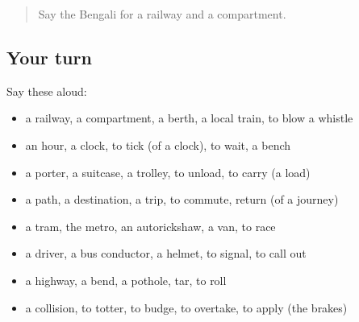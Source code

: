 \label{lesson:BN-R391-review-384-391}



\begin{quote}
Say the Bengali for a railway and a compartment.
\end{quote}

\subsection*{Your turn}
Say these aloud:

\begin{itemize}
\raggedright
  \item a railway, a compartment, a berth, a local train, to blow a whistle
  \item an hour, a clock, to tick (of a clock), to wait, a bench
  \item a porter, a suitcase, a trolley, to unload, to carry (a load)
  \item a path, a destination, a trip, to commute, return (of a journey)
  \item a tram, the metro, an autorickshaw, a van, to race
  \item a driver, a bus conductor, a helmet, to signal, to call out
  \item a highway, a bend, a pothole, tar, to roll
  \item a collision, to totter, to budge, to overtake, to apply (the brakes)
\end{itemize}

